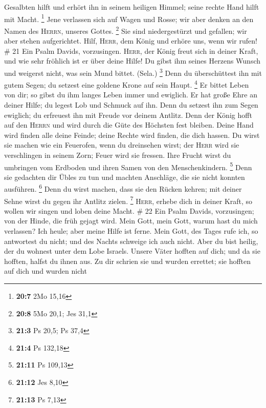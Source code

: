 Gesalbten hilft und erhört ihn in seinem heiligen Himmel; seine rechte
Hand hilft mit Macht. \footnote{\textbf{20:7} 2Mo 15,16} 
Jene verlassen sich auf Wagen und Rosse; wir aber denken an den Namen
des \textsc{Herrn}, unseres Gottes. \footnote{\textbf{20:8} 5Mo 20,1;
  Jes 31,1}  Sie sind niedergestürzt und gefallen; wir
aber stehen aufgerichtet.  Hilf, \textsc{Herr}, dem König
und erhöre uns, wenn wir rufen! \# 21  Ein Psalm Davids,
vorzusingen.  \textsc{Herr}, der König freut sich in
deiner Kraft, und wie sehr fröhlich ist er über deine Hilfe!
 Du gibst ihm seines Herzens Wunsch und weigerst nicht,
was sein Mund bittet. (Sela.) \footnote{\textbf{21:3} Ps 20,5; Ps 37,4}
 Denn du überschüttest ihn mit gutem Segen; du setzest
eine goldene Krone auf sein Haupt. \footnote{\textbf{21:4} Ps 132,18}
 Er bittet Leben von dir; so gibst du ihm langes Leben
immer und ewiglich.  Er hat große Ehre an deiner Hilfe; du
legest Lob und Schmuck auf ihn.  Denn du setzest ihn zum
Segen ewiglich; du erfreuest ihn mit Freude vor deinem Antlitz.
 Denn der König hofft auf den \textsc{Herrn} und wird
durch die Güte des Höchsten fest bleiben.  Deine Hand wird
finden alle deine Feinde; deine Rechte wird finden, die dich hassen.
 Du wirst sie machen wie ein Feuerofen, wenn du
dreinsehen wirst; der \textsc{Herr} wird sie verschlingen in seinem
Zorn; Feuer wird sie fressen.  Ihre Frucht wirst du
umbringen vom Erdboden und ihren Samen von den Menschenkindern.
\footnote{\textbf{21:11} Ps 109,13}  Denn sie gedachten
dir Übles zu tun und machten Anschläge, die sie nicht konnten ausführen.
\footnote{\textbf{21:12} Jes 8,10}  Denn du wirst machen,
dass sie den Rücken kehren; mit deiner Sehne wirst du gegen ihr Antlitz
zielen. \footnote{\textbf{21:13} Ps 7,13}  \textsc{Herr},
erhebe dich in deiner Kraft, so wollen wir singen und loben deine Macht.
\# 22  Ein Psalm Davids, vorzusingen; von der Hinde, die
früh gejagt wird.  Mein Gott, mein Gott, warum hast du
mich verlassen? Ich heule; aber meine Hilfe ist ferne. 
Mein Gott, des Tages rufe ich, so antwortest du nicht; und des Nachts
schweige ich auch nicht.  Aber du bist heilig, der du
wohnest unter dem Lobe Israels.  Unsere Väter hofften auf
dich; und da sie hofften, halfst du ihnen aus.  Zu dir
schrien sie und wurden errettet; sie hofften auf dich und wurden nicht
